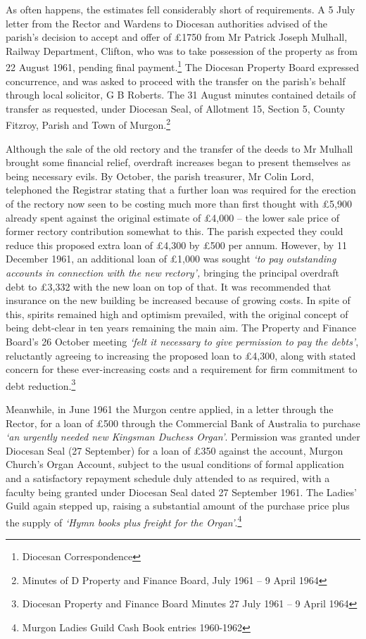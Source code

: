 As often happens, the estimates fell considerably short of requirements. A 5 July letter from the Rector and Wardens to Diocesan authorities advised of the parish's decision to accept and offer of £1750 from Mr Patrick Joseph Mulhall, Railway Department, Clifton, who was to take possession of the property as from 22 August 1961, pending final payment.\footnote{Diocesan Correspondence} The Diocesan Property Board expressed concurrence, and was asked to proceed with the transfer on the parish's behalf through local solicitor, G B Roberts. The 31 August minutes contained details of transfer as requested, under Diocesan Seal, of Allotment 15, Section 5, County Fitzroy, Parish and Town of Murgon.\footnote{Minutes of D Property and Finance Board, July 1961 -- 9 April 1964}

Although the sale of the old rectory and the transfer of the deeds to Mr Mulhall brought some financial relief, overdraft increases began to present themselves as being necessary evils. By October, the parish treasurer, Mr Colin Lord, telephoned the Registrar stating that a further loan was required for the erection of the rectory now seen to be costing much more than first thought with £5,900 already spent against the original estimate of £4,000 -- the lower sale price of former rectory contribution somewhat to this. The parish expected they could reduce this proposed extra loan of £4,300 by £500 per annum. However, by 11 December 1961, an additional loan of £1,000 was sought \emph{`to pay outstanding accounts in connection with the new rectory',} bringing the principal overdraft debt to £3,332 with the new loan on top of that. It was recommended that insurance on the new building be increased because of growing costs. In spite of this, spirits remained high and optimism prevailed, with the original concept of being debt-clear in ten years remaining the main aim. The Property and Finance Board's 26 October meeting \emph{`felt it necessary to give permission to pay the debts'}, reluctantly agreeing to increasing the proposed loan to £4,300, along with stated concern for these ever-increasing costs and a requirement for firm commitment to debt reduction.\footnote{Diocesan Property and Finance Board Minutes 27 July 1961 -- 9 April 1964}

Meanwhile, in June 1961 the Murgon centre applied, in a letter through the Rector, for a loan of £500 through the Commercial Bank of Australia to purchase \emph{`an urgently needed new Kingsman Duchess Organ'}. Permission was granted under Diocesan Seal (27 September) for a loan of £350 against the account, Murgon Church's Organ Account, subject to the usual conditions of formal application and a satisfactory repayment schedule duly attended to as required, with a faculty being granted under Diocesan Seal dated 27 September 1961. The Ladies' Guild again stepped up, raising a substantial amount of the purchase price plus the supply of \emph{`Hymn books plus freight for the Organ'}.\footnote{Murgon Ladies Guild Cash Book entries 1960-1962}


